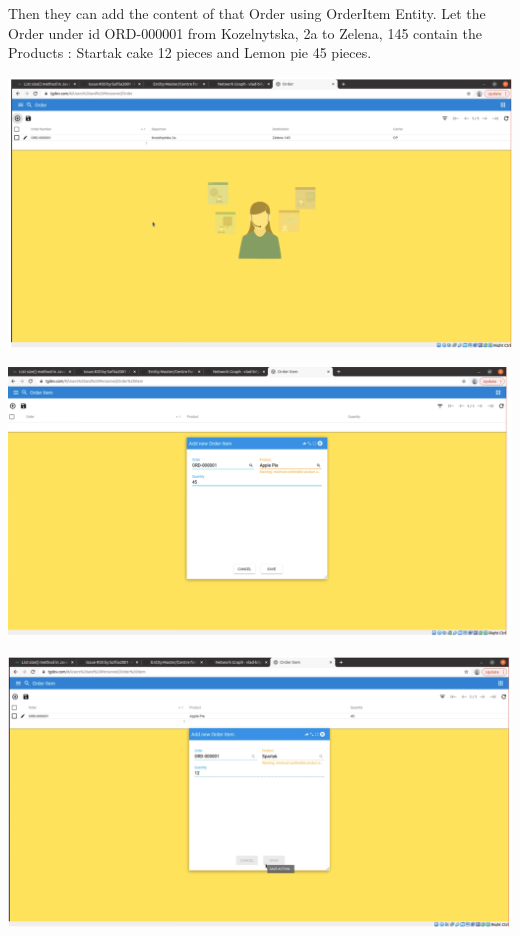 Then they can add the content of that Order using OrderItem Entity. Let the Order under id ORD-000001 from Kozelnytska, 2a to Zelena, 145 contain the Products : Startak cake 12  pieces and Lemon pie 45 pieces. 

\includegraphics[width=\textwidth]{sections/01-chapter/images/orderitem2.png}

\includegraphics[width=\textwidth]{sections/01-chapter/images/orderitem3.png}

\includegraphics[width=\textwidth]{sections/01-chapter/images/orderitem4.png}

